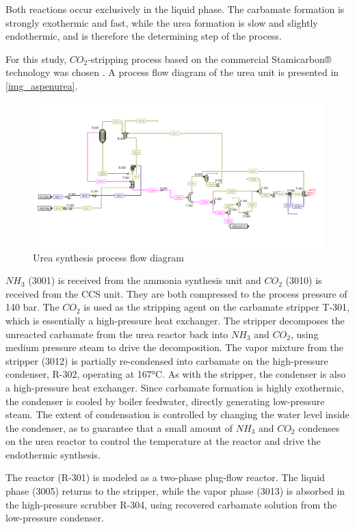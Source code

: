 \documentclass[a4paper, titlepage]{article}
\begin{document}
Both reactions occur exclusively in the liquid phase. The carbamate formation is strongly exothermic and fast, while
the urea formation is slow and slightly endothermic, and is therefore the determining step of the process.

For this study, $CO_2$-stripping process based on the commercial Stamicarbon® technology was chosen
\cite{meessenUreaSynthesis2014}. A process flow diagram of the urea unit is presented in \autoref{img_aspenurea}.

\begin{figure}[htb]
    \includegraphics[width=\textwidth]{img/aspen_urea.png}
    \caption{Urea synthesis process flow diagram}
    \label{img_aspenurea}
\end{figure}

$NH_3$ (3001) is received from the ammonia synthesis unit and $CO_2$ (3010) is received from the CCS unit. They are
both compressed to the process pressure of 140 bar. The $CO_2$ is used as the stripping agent on the carbamate
stripper T-301, which is essentially a high-pressure heat exchanger. The stripper decomposes the unreacted carbamate
from the urea reactor back into $NH_3$ and $CO_2$, using medium pressure steam to drive the decomposition. The vapor
mixture from the stripper (3012) is partially re-condensed into carbamate on the high-pressure condenser, R-302,
operating at 167°C. As with the stripper, the condenser is also a high-pressure heat exchanger. Since carbamate
formation is highly exothermic, the condenser is cooled by boiler feedwater, directly generating low-pressure steam.
The extent of condensation is controlled by changing the water level inside the condenser, as to guarantee that a
small amount of $NH_3$ and $CO_2$ condenses on the urea reactor to control the temperature at the reactor and
drive the endothermic synthesis.

The reactor (R-301) is modeled as a two-phase plug-flow reactor. The liquid phase (3005) returns to the stripper,
while the vapor phase (3013) is absorbed in the high-pressure scrubber R-304, using recovered carbamate solution from
the low-pressure condenser.
\end{document}
